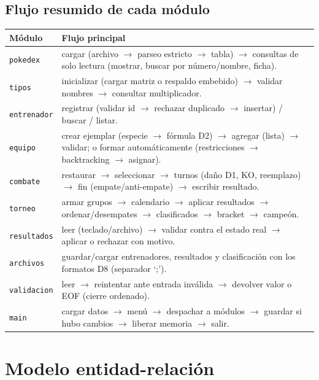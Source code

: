 \documentclass[11pt,a4paper]{article}
\begin{document}
\subsection{Flujo resumido de cada m\'odulo}
\begin{longtable}{p{3.0cm} p{12.2cm}}
\toprule
\textbf{M\'odulo} & \textbf{Flujo principal} \\
\midrule
\texttt{pokedex} & cargar (archivo $\to$ parseo estricto $\to$ tabla) $\to$ consultas de solo lectura (mostrar, buscar por n\'umero/nombre, ficha). \\
\texttt{tipos} & inicializar (cargar matriz o respaldo embebido) $\to$ validar nombres $\to$ consultar multiplicador. \\
\texttt{entrenador} & registrar (validar id $\to$ rechazar duplicado $\to$ insertar) / buscar / listar. \\
\texttt{equipo} & crear ejemplar (especie $\to$ f\'ormula D2) $\to$ agregar (lista) $\to$ validar; o formar autom\'aticamente (restricciones $\to$ backtracking $\to$ asignar). \\
\texttt{combate} & restaurar $\to$ seleccionar $\to$ turnos (da\~no D1, KO, reemplazo) $\to$ fin (empate/anti-empate) $\to$ escribir resultado. \\
\texttt{torneo} & armar grupos $\to$ calendario $\to$ aplicar resultados $\to$ ordenar/desempates $\to$ clasificados $\to$ bracket $\to$ campe\'on. \\
\texttt{resultados} & leer (teclado/archivo) $\to$ validar contra el estado real $\to$ aplicar o rechazar con motivo. \\
\texttt{archivos} & guardar/cargar entrenadores, resultados y clasificaci\'on con los formatos D8 (separador `;'). \\
\texttt{validacion} & leer $\to$ reintentar ante entrada inv\'alida $\to$ devolver valor o EOF (cierre ordenado). \\
\texttt{main} & cargar datos $\to$ men\'u $\to$ despachar a m\'odulos $\to$ guardar si hubo cambios $\to$ liberar memoria $\to$ salir. \\
\bottomrule
\end{longtable}

\section{Modelo entidad-relaci\'on}
\end{document}
